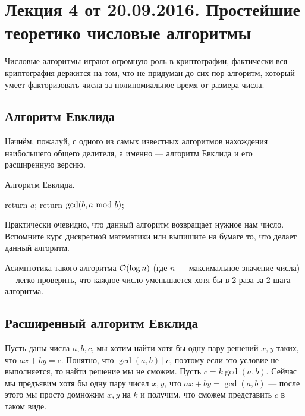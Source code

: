 \documentclass[a4paper, 12pt]{article}
\begin{document}
\pagestyle{fancy}

\section{Лекция 4 от 20.09.2016. Простейшие теоретико числовые алгоритмы}

Числовые алгоритмы играют огромную роль в криптографии, фактически вся криптография
держится на том, что не придуман до сих пор алгоритм, который умеет факторизовать числа за
полиномиальное время от размера числа.

\subsection{Алгоритм Евклида}

Начнём, пожалуй, с одного из самых известных алгоритмов нахождения наибольшего
общего делителя, а именно --- алгоритм Евклида и его расширенную версию.

\begin{algorithm}
  \caption{Алгоритм Евклида.}
  \begin{algorithmic}[1]
        \State return $a$;
      \Else
        \State return $\gcd(b, a \ \text{mod} \  b)$;
      \EndIf
    \EndFunction
  \end{algorithmic}
\end{algorithm}

Практически очевидно, что данный алгоритм возвращает нужное нам число.
Вспомните курс дискретной математики или выпишите на бумаге то,
что делает данный алгоритм. 

Асимптотика такого алгоритма $\mathcal{O}(\log n)$ (где $n$ --- максимальное значение числа)
--- легко проверить, что каждое число уменьшается хотя бы в 2 раза за 2 шага алгоритма.

\subsection{Расширенный алгоритм Евклида}

Пусть даны числа $a, b, c$, мы хотим найти хотя бы одну пару решений $x, y$ таких,
что $ax + by = c$. Понятно, что $\gcd(a, b) \ | \ c$, поэтому если это условие
не выполняется, то найти решение мы не сможем. Пусть $c = k \gcd(a, b)$. Сейчас
мы предъявим хотя бы одну пару чисел $x, y$, что $ax + by = \gcd(a, b)$ --- после этого
мы просто домножим $x, y$ на $k$ и получим, что сможем представить $c$ в таком
виде.
\end{document}
